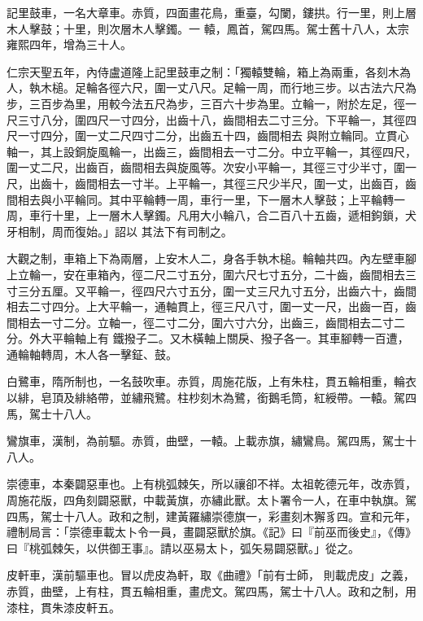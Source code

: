 \begin{pinyinscope}
 記里鼓車，一名大章車。赤質，四面畫花鳥，重臺，勾闌，鏤拱。行一里，則上層木人擊鼓；十里，則次層木人擊鐲。一
 轅，鳳首，駕四馬。駕士舊十八人，太宗雍熙四年，增為三十人。



 仁宗天聖五年，內侍盧道隆上記里鼓車之制：「獨轅雙輪，箱上為兩重，各刻木為人，執木槌。足輪各徑六尺，圍一丈八尺。足輪一周，而行地三步。以古法六尺為步，三百步為里，用較今法五尺為步，三百六十步為里。立輪一，附於左足，徑一尺三寸八分，圍四尺一寸四分，出齒十八，齒間相去二寸三分。下平輪一，其徑四尺一寸四分，圍一丈二尺四寸二分，出齒五十四，齒間相去
 與附立輪同。立貫心軸一，其上設銅旋風輪一，出齒三，齒間相去一寸二分。中立平輪一，其徑四尺，圍一丈二尺，出齒百，齒間相去與旋風等。次安小平輪一，其徑三寸少半寸，圍一尺，出齒十，齒間相去一寸半。上平輪一，其徑三尺少半尺，圍一丈，出齒百，齒間相去與小平輪同。其中平輪轉一周，車行一里，下一層木人擊鼓；上平輪轉一周，車行十里，上一層木人擊鐲。凡用大小輪八，合二百八十五齒，遞相鉤鎖，犬牙相制，周而復始。」詔以
 其法下有司制之。



 大觀之制，車箱上下為兩層，上安木人二，身各手執木槌。輪軸共四。內左壁車腳上立輪一，安在車箱內，徑二尺二寸五分，圍六尺七寸五分，二十齒，齒間相去三寸三分五厘。又平輪一，徑四尺六寸五分，圍一丈三尺九寸五分，出齒六十，齒間相去二寸四分。上大平輪一，通軸貫上，徑三尺八寸，圍一丈一尺，出齒一百，齒間相去一寸二分。立軸一，徑二寸二分，圍六寸六分，出齒三，齒間相去二寸二分。外大平輪軸上有
 鐵撥子二。又木橫軸上關戾、撥子各一。其車腳轉一百遭，通輪軸轉周，木人各一擊鉦、鼓。



 白鷺車，隋所制也，一名鼓吹車。赤質，周施花版，上有朱柱，貫五輪相重，輪衣以緋，皂頂及緋絡帶，並繡飛鷺。柱杪刻木為鷺，銜鵝毛筒，紅綬帶。一轅。駕四馬，駕士十八人。



 鸞旗車，漢制，為前驅。赤質，曲壁，一轅。上載赤旗，繡鸞鳥。駕四馬，駕士十八人。



 崇德車，本秦闢惡車也。上有桃弧棘矢，所以禳卻不祥。太祖乾德元年，改赤質，周施花版，四角刻闢惡獸，中載黃旗，亦繡此獸。太卜署令一人，在車中執旗。駕四馬，駕士十八人。政和之制，建黃羅繡崇德旗一，彩畫刻木獬豸四。宣和元年，禮制局言：「崇德車載太卜令一員，畫闢惡獸於旗。《記》曰『前巫而後史』，《傳》曰『桃弧棘矢，以供御王事』。請以巫易太卜，弧矢易闢惡獸。」從之。



 皮軒車，漢前驅車也。冒以虎皮為軒，取《曲禮》「前有士師，
 則載虎皮」之義，赤質，曲壁，上有柱，貫五輪相重，畫虎文。駕四馬，駕士十八人。政和之制，用漆柱，貫朱漆皮軒五。




\end{pinyinscope}
